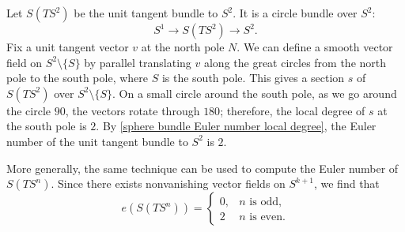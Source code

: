 \begin{example}
Let $S(TS^2)$ be the unit tangent bundle to $S^2$. It is a circle bundle over $S^2$:
\[S^1\to S(TS^2)\to S^2.\]
Fix a unit tangent vector $v$ at the north pole $N$. We can define a smooth vector field on $S^2\setminus\{S\}$ by parallel translating $v$ along the great circles from 
the north pole to the south pole, where $S$ is the south pole. This gives a section $s$ of $S(TS^2)$ over $S^2\setminus\{S\}$. On a small circle around the south pole, 
as we go around the circle $90$, the vectors rotate through $180$; therefore, the local degree of $s$ at the south pole is $2$. By 
\cref{sphere bundle Euler number local degree}, the Euler number of the unit tangent bundle to $S^2$ is $2$.\par
More generally, the same technique can be used to compute the Euler number of $S(TS^n)$. Since there exists nonvanishing vector fields on $S^{k+1}$, we find that
\[e(S(TS^n))=\begin{cases}
0,&\text{$n$ is odd},\\
2&\text{$n$ is even}.
\end{cases}\]
\end{example}
